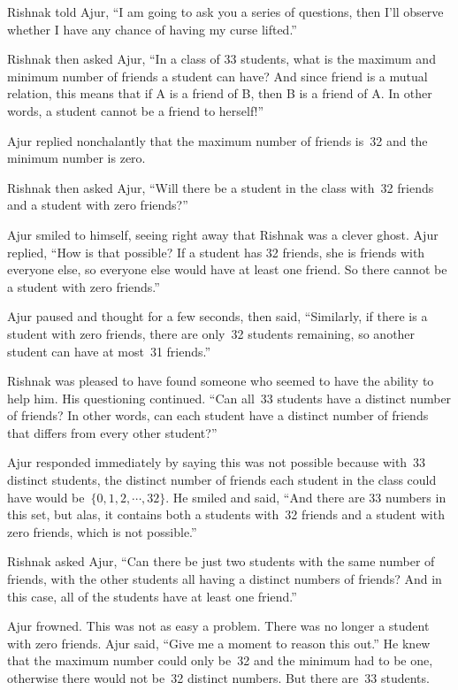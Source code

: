 Rishnak told Ajur, ``I am going to ask you a series of questions, then I'll observe whether I have any chance of having my curse lifted.''

Rishnak then asked Ajur, ``In a class of 33 students, what is the maximum and minimum number of friends a student can have? And since friend is a mutual relation, this means that if A is a friend of B, then B is a friend of A.  In other words, a student cannot be a friend to herself!''

Ajur replied nonchalantly that the maximum number of friends is~32 and the minimum number is zero.

Rishnak then asked Ajur, ``Will there be a student in the class with~32 friends and a student with zero friends?''

Ajur smiled to himself, seeing right away that Rishnak was a clever ghost.  Ajur replied, ``How is that possible?  If a student has 32 friends, she is friends with everyone else, so everyone else would have at least one friend.  So there cannot be a student with zero friends.''

Ajur paused and thought for a few seconds, then said, ``Similarly, if there is a student with zero friends, there are only~32 students remaining, so another student can have at most~31 friends.''

Rishnak was pleased to have found someone who seemed to have the ability to help him. His questioning continued.  ``Can all~33 students have a distinct number of friends? In other words, can each student have a distinct number of friends that differs from every other student?''

Ajur responded immediately by saying this was not possible because with~33 distinct students, the distinct number of friends each student in the class could have would be~$\{0,1,2,\cdots,32\}$. He smiled and said, ``And there are 33 numbers in this set, but alas, it contains both a students with~32 friends and a student with zero friends, which is not possible.''

Rishnak asked Ajur, ``Can there be just two students with the same number of friends, with the other students all having a distinct numbers of friends? And in this case, all of the students have at least one friend.''

Ajur frowned. This was not as easy a problem. There was no longer a student with zero friends. Ajur said, ``Give me a moment to reason this out.'' He knew that the maximum number could only be~32 and the minimum had to be one, otherwise there would not be~32 distinct numbers. But there are~33 students.

